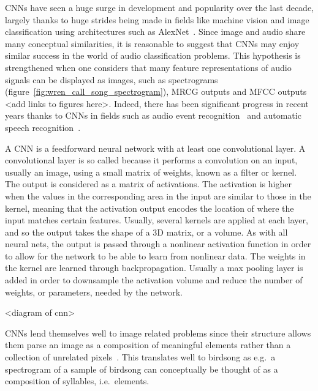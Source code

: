 CNNs have seen a huge surge in development and popularity over the last decade,
largely thanks to huge strides being made in fields like machine vision and
image classification using architectures such as
AlexNet~\cite{krizhevsky2012imagenet}. Since image and audio share many
conceptual similarities, it is reasonable to suggest that CNNs may enjoy similar
success in the world of audio classification problems. This hypothesis is
strengthened when one considers that many feature representations of audio
signals can be displayed as images, such as spectrograms
(figure~\ref{fig:wren_call_song_spectrogram}), MRCG outputs and MFCC outputs
<add links to figures here>. Indeed, there has been significant progress in
recent years thanks to CNNs in fields such as audio event
recognition~\cite{takahashi2017aenet} and automatic speech
recognition~\cite{sercu2016very}.

A CNN is a feedforward neural network with at least one convolutional layer. A
convolutional layer is so called because it performs a convolution on an input,
usually an image, using a small matrix of weights, known as a filter or kernel.
The output is considered as a matrix of activations. The activation is higher
when the values in the corresponding area in the input are similar to those in
the kernel, meaning that the activation output encodes the location of where the
input matches certain features. Usually, several kernels are applied at each
layer, and so the output takes the shape of a 3D matrix, or a volume. As with
all neural nets, the output is passed through a nonlinear activation function in
order to allow for the network to be able to learn from nonlinear data. The
weights in the kernel are learned through backpropagation. Usually a max
pooling layer is added in order to downsample the activation volume and reduce
the number of weights, or parameters, needed by the network.

<diagram of cnn>

CNNs lend themselves well to image related problems since their structure
allows them parse an image as a composition of meaningful elements rather than a
collection of unrelated pixels~\cite{lecun2015deep}. This translates well to
birdsong as e.g.\ a spectrogram of a sample of birdsong can conceptually be
thought of as a composition of syllables, i.e.\ elements.


